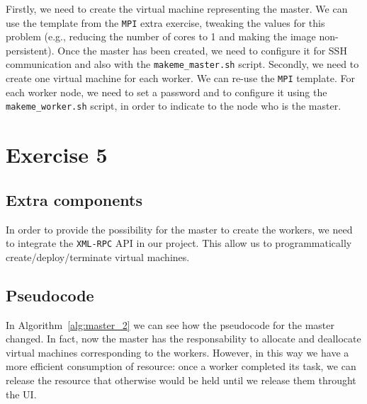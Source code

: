 \documentclass[a4paper]{article}
\begin{document}
Firstly, we need to create the virtual machine representing the master. We can use the template from the \texttt{MPI} extra exercise, tweaking the values for this problem (e.g., reducing the number of cores to 1 and making the image non-persistent). Once the master has been created, we need to configure it for SSH communication and also with the \texttt{makeme\_master.sh} script. Secondly, we need to create one virtual machine for each worker. We can re-use the \texttt{MPI} template. For each worker node, we need to set a password and to configure it using the \texttt{makeme\_worker.sh} script, in order to indicate to the node who is the master.

\section{Exercise 5}


\subsection{Extra components}

In order to provide the possibility for the master to create the workers, we need to integrate the \texttt{XML-RPC} API in our project. This allow us to programmatically create/deploy/terminate virtual machines.

\subsection{Pseudocode}


In Algorithm~\ref{alg:master_2} we can see how the pseudocode for the master changed. In fact, now the master has the responsability to allocate and deallocate virtual machines corresponding to the workers. However, in this way we have a more efficient consumption of resource: once a worker completed its task, we can release the resource that otherwise would be held until we release them throught the UI.
\end{document}
